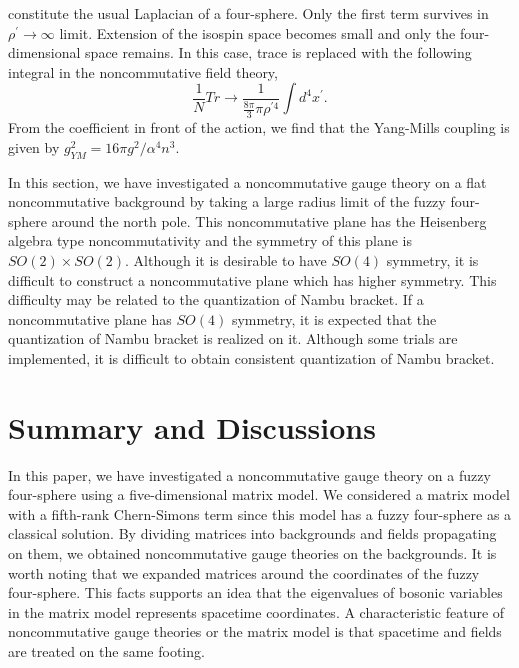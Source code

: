 \documentclass[a4paper,11pt]{article}
\begin{document}
constitute the usual Laplacian of a four-sphere. 
Only the first term survives in $\rho^{\prime} \rightarrow \infty$
limit. 
Extension of the isospin space becomes small 
and only the four-dimensional space 
remains. 
In this case, trace is replaced with the following 
integral in the noncommutative field theory, 
\begin{equation}
\frac{1}{N}Tr \rightarrow 
\frac{1}{\frac{8\pi}{3}\pi\rho^{\prime 4}}
\int d^{4}x^{\prime}. 
\end{equation}
From the coefficient in front of the action, we find that 
the Yang-Mills coupling is given by 
$g_{YM}^{2}=16\pi g^{2}/\alpha^{4}n^{3}$.  

\vspace{0.4cm} 

In this section, 
we have investigated a noncommutative gauge theory on a flat noncommutative 
background by taking a large radius limit of the fuzzy four-sphere 
around the north pole. 
This noncommutative plane has the Heisenberg algebra type 
noncommutativity and the symmetry of this plane 
is $SO(2)\times SO(2)$. 
Although it is desirable to have $SO(4)$ symmetry,  
it is difficult to construct a noncommutative plane 
which has higher symmetry. 
This difficulty may be related to the quantization of 
Nambu bracket\cite{Nambu}. 
If a noncommutative plane has $SO(4)$ symmetry, 
it is expected that the quantization of 
Nambu bracket is realized on it. 
Although some trials\cite{ALMY,DFST} 
are implemented, 
it is difficult to obtain consistent quantization of 
Nambu bracket. 





\section{Summary and Discussions}
\hspace{0.4cm}
In this paper, we have investigated 
a noncommutative gauge theory on a fuzzy four-sphere
using a five-dimensional matrix model. 
We considered a matrix model with a fifth-rank Chern-Simons term 
since this model has a fuzzy four-sphere as a classical solution.  
By dividing matrices into backgrounds 
and fields propagating on them, 
we obtained noncommutative gauge theories on the backgrounds. 
It is worth noting that 
we expanded matrices around the coordinates of 
the fuzzy four-sphere. 
This facts supports an idea that the eigenvalues of bosonic variables 
in the matrix model represents spacetime coordinates. 
A characteristic feature of noncommutative gauge theories 
or the matrix model is that 
spacetime and fields are treated on the same footing. 
\end{document}
